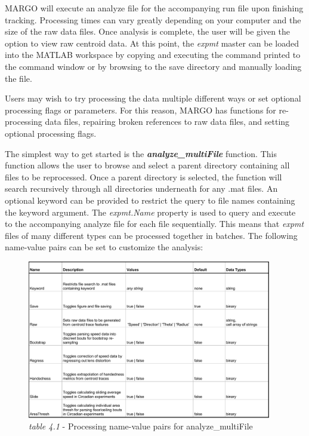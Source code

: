 \documentclass[11pt]{article}
\begin{document}
MARGO will execute an analyze file for the  accompanying run file upon finishing tracking. Processing times can vary greatly depending on your computer and the size of the raw data files. Once analysis is complete, the user will be given the option to view raw centroid data. At this point, the \emph{expmt} master can be loaded into the MATLAB workspace by copying and executing the command printed to the command window or by browsing to the save directory and manually loading the file.

Users may wish to try processing the data multiple different ways or set optional  processing flags or parameters. For this reason, MARGO has functions for re-processing data files, repairing broken references to raw data files, and setting optional processing flags.

The simplest way to get started is the \textbf{\textit{analyze\_multiFile}} function. This function allows the user to browse and select a parent directory containing all files to be reprocessed. Once a parent directory is selected, the function will search recursively through all directories underneath for any .mat files. An optional keyword can be provided to restrict the query to file names containing the keyword argument. The \textit{expmt.Name} property is used to query and execute to the accompanying analyze file for each file sequentially. This means that \textit{expmt} files of many different types can be processed together in batches. The following name-value pairs can be set to customize the analysis:

\begin{figure}[h!]
	\vspace*{0.75cm}
	\begin{center}
		\includegraphics[width=0.95\textwidth]{images/analysis/namevalue.pdf}
		\caption*{\footnotesize {\textit{table 4.1} - Processing name-value pairs for analyze\_multiFile}}
	\end{center}
\end{figure}
\end{document}
